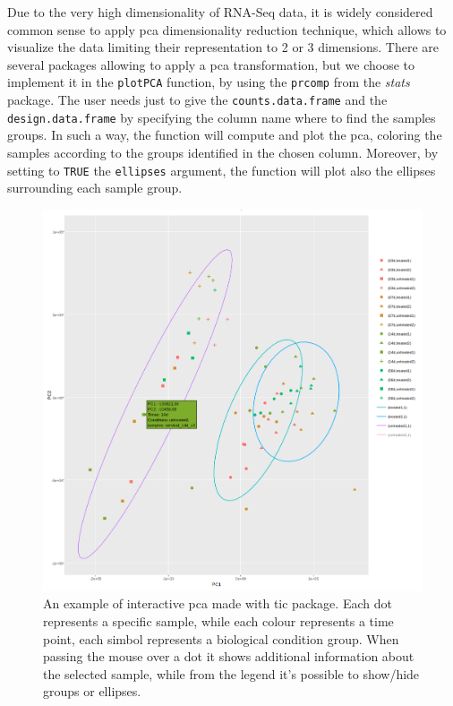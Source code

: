 Due to the very high dimensionality of RNA-Seq data, it is widely considered common sense to apply \gls{pca} dimensionality reduction technique, which allows to visualize the data limiting their representation to 2 or 3 dimensions.
There are several packages allowing to apply a \gls{pca} transformation, but we choose to implement it in the \lstinline!plotPCA! function, by using the \lstinline!prcomp! from the \textit{stats} package.
The user needs just to give the \lstinline!counts.data.frame! and the \lstinline!design.data.frame! by specifying the column name where to find the samples groups.
In such a way, the function will compute and plot the \gls{pca}, coloring the samples according to the groups identified in the chosen column.
Moreover, by setting to \lstinline!TRUE! the \lstinline!ellipses! argument, the function will plot also the ellipses surrounding each sample group.

\begin{figure}[H]
\includegraphics[width=\textwidth,height=\textheight,keepaspectratio]{img/ticorser/pca_example.png}
\caption[ticorser pca]{An example of interactive \gls{pca} made with \gls{tic} package. Each dot represents a specific sample, while each colour represents a time point, each simbol represents a biological condition group. When passing the mouse over a dot it shows additional information about the selected sample, while from the legend it's possible to show/hide groups or ellipses.}
\label{fig:ticorserpca}
\centering
\end{figure}

